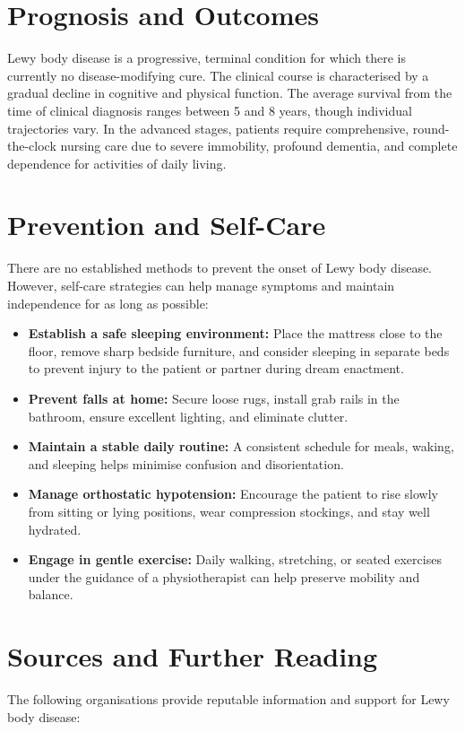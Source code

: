 \section*{Prognosis and Outcomes}
Lewy body disease is a progressive, terminal condition for which there is currently no disease-modifying cure. The clinical course is characterised by a gradual decline in cognitive and physical function. The average survival from the time of clinical diagnosis ranges between 5 and 8 years, though individual trajectories vary. In the advanced stages, patients require comprehensive, round-the-clock nursing care due to severe immobility, profound dementia, and complete dependence for activities of daily living.

\section*{Prevention and Self-Care}
There are no established methods to prevent the onset of Lewy body disease. However, self-care strategies can help manage symptoms and maintain independence for as long as possible:

\begin{itemize}
    \item \textbf{Establish a safe sleeping environment:} Place the mattress close to the floor, remove sharp bedside furniture, and consider sleeping in separate beds to prevent injury to the patient or partner during dream enactment.
    \item \textbf{Prevent falls at home:} Secure loose rugs, install grab rails in the bathroom, ensure excellent lighting, and eliminate clutter.
    \item \textbf{Maintain a stable daily routine:} A consistent schedule for meals, waking, and sleeping helps minimise confusion and disorientation.
    \item \textbf{Manage orthostatic hypotension:} Encourage the patient to rise slowly from sitting or lying positions, wear compression stockings, and stay well hydrated.
    \item \textbf{Engage in gentle exercise:} Daily walking, stretching, or seated exercises under the guidance of a physiotherapist can help preserve mobility and balance.
\end{itemize}

\section*{Sources and Further Reading}
The following organisations provide reputable information and support for Lewy body disease:

